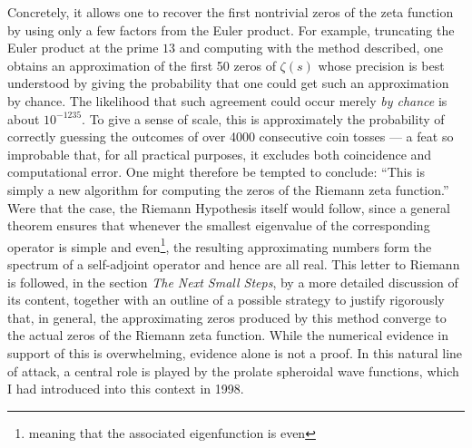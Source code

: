 \documentclass{article}
\begin{document}
Concretely, it allows one to recover the first nontrivial zeros of the zeta function 
by using only a few factors from the Euler product. For example, truncating the 
Euler product at the prime $13$ and computing with the method described, one obtains 
an approximation of the first 50 zeros of $\zeta(s)$  whose precision is best understood by giving the probability that one could get such an approximation by chance. The likelihood 
that such agreement could occur merely \emph{by chance} is about $10^{-1235}$. 
To give a sense of scale, this is approximately the probability of correctly 
guessing the outcomes of over 4000 consecutive coin tosses --- a feat so 
improbable that, for all practical purposes, it excludes both coincidence 
and computational error.\newline
One might therefore be tempted to conclude: ``This is simply a new algorithm for 
computing the zeros of the Riemann zeta function.'' Were that the case, the Riemann 
Hypothesis itself would follow, since a general theorem ensures that whenever the 
smallest eigenvalue of the corresponding operator is simple and even\footnote{meaning that the associated eigenfunction is even}, 
the resulting approximating numbers form the spectrum of a self-adjoint operator 
and hence are all real. 
   \newline
This letter to Riemann is followed, in the section \textit{The Next Small Steps}, 
by a more detailed discussion of its content, together with an outline of a 
possible strategy to justify rigorously that, in general, the approximating 
zeros produced by this method converge to the actual zeros of the Riemann 
zeta function. While the numerical evidence in support of this is overwhelming, 
evidence alone is not a proof. In this natural line of attack, a central role is 
played by the prolate spheroidal wave functions, which I had introduced into 
this context in 1998. 
\end{document}
